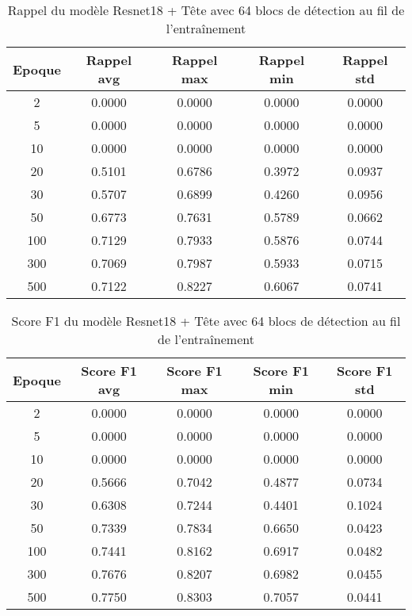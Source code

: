 \begin{table}[!ht]
    \caption{Rappel du modèle Resnet18 + Tête avec 64 blocs de détection au fil de l'entraînement}
    \label{tab:resnet18+head_64n_rappel}
    \centering
    \begin{tabular}{ |c||c|c|c|c|  }
        \hline
        \rowcolor{gray!50}
        Epoque & Rappel avg & Rappel max & Rappel min & Rappel std\\
        \hline
        2 & 0.0000 & 0.0000 & 0.0000 & 0.0000\\
        5 & 0.0000 & 0.0000 & 0.0000 & 0.0000\\
        10 & 0.0000 & 0.0000 & 0.0000 & 0.0000\\
        20 & 0.5101 & 0.6786 & 0.3972 & 0.0937\\
        30 & 0.5707 & 0.6899 & 0.4260 & 0.0956\\
        50 & 0.6773 & 0.7631 & 0.5789 & 0.0662\\
        100 & 0.7129 & 0.7933 & 0.5876 & 0.0744\\
        300 & 0.7069 & 0.7987 & 0.5933 & 0.0715\\
        500 & 0.7122 & 0.8227 & 0.6067 & 0.0741\\
        \hline
    \end{tabular}
\end{table}

\begin{table}[!ht]
    \caption{Score F1 du modèle Resnet18 + Tête avec 64 blocs de détection au fil de l'entraînement}
    \label{tab:resnet18+head_64n_f1score}
    \centering
    \begin{tabular}{ |c||c|c|c|c|  }
        \hline
        \rowcolor{gray!50}
        Epoque & Score F1 avg & Score F1 max & Score F1 min & Score F1 std\\
        \hline
        2 & 0.0000 & 0.0000 & 0.0000 & 0.0000\\
        5 & 0.0000 & 0.0000 & 0.0000 & 0.0000\\
        10 & 0.0000 & 0.0000 & 0.0000 & 0.0000\\
        20 & 0.5666 & 0.7042 & 0.4877 & 0.0734\\
        30 & 0.6308 & 0.7244 & 0.4401 & 0.1024\\
        50 & 0.7339 & 0.7834 & 0.6650 & 0.0423\\
        100 & 0.7441 & 0.8162 & 0.6917 & 0.0482\\
        300 & 0.7676 & 0.8207 & 0.6982 & 0.0455\\
        500 & 0.7750 & 0.8303 & 0.7057 & 0.0441\\
        \hline
    \end{tabular}
\end{table}

